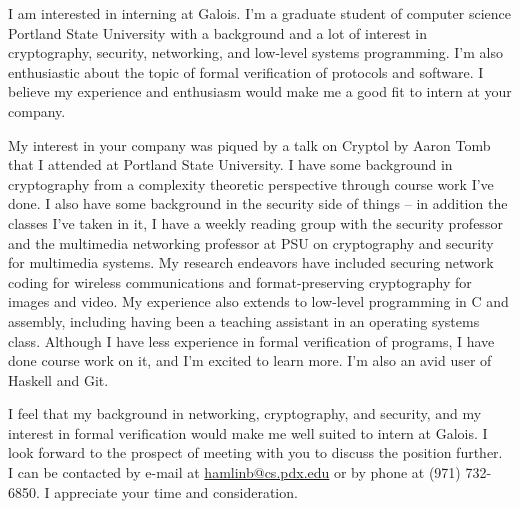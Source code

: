 \documentclass[10pt,stdletter,dateno,sigleft]{newlfm} %
\begin{document}
\begin{newlfm}


I am interested in interning at Galois. I'm a graduate student of computer
science Portland State University with a background and a lot of interest
in cryptography, security, networking, and low-level systems programming. I'm
also enthusiastic about the topic of formal verification of protocols and
software. I believe my experience and enthusiasm would make me a good fit to
intern at your company.

My interest in your company was piqued by a talk on Cryptol by Aaron Tomb that I
attended at Portland State University. I have some background in cryptography
from a complexity theoretic perspective through course work I've done. I also
have some background in the security side of things -- in addition the classes
I've taken in it, I have a weekly reading group with the security professor and
the multimedia networking professor at PSU on cryptography and security for
multimedia systems. My research endeavors have included securing network coding
for wireless communications and format-preserving cryptography for images and
video. My experience also extends to low-level programming in C and assembly,
including having been a teaching assistant in an operating systems class.
Although I have less experience in formal verification of programs, I have done
course work on it, and I'm excited to learn more. I'm also an avid user of
Haskell and Git.

I feel that my background in networking, cryptography, and security, and my
interest in formal verification would make me well suited to intern at Galois. I
look forward to the prospect of meeting with you to discuss the position
further. I can be contacted by e-mail at
\href{mailto:hamlinb@cs.pdx.edu}{hamlinb@cs.pdx.edu} or by phone at
(971) 732-6850. I appreciate your time and consideration.


\end{newlfm}
\end{document}
